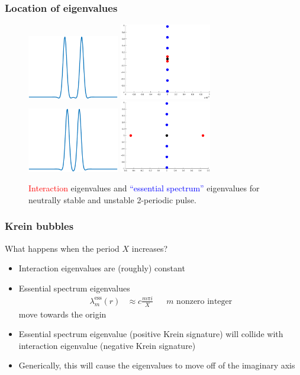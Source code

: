 \documentclass[16pt]{beamer}
\begin{document}
\begin{frame}
	\frametitle{Location of eigenvalues}
	\fontsize{16}{7.2}\selectfont
		\begin{figure}
		\begin{center}
		\includegraphics[width=4cm]{images/2pulsestable}
		\includegraphics[width=4cm]{images/2pulsestableeig}
		\includegraphics[width=4cm]{images/2pulseunstable}
		\includegraphics[width=4cm]{images/2pulseunstableeig}
		\end{center}
		\caption{\textcolor{red}{Interaction} eigenvalues and \textcolor{blue}{``essential spectrum''} eigenvalues for neutrally stable and unstable 2-periodic pulse.}
		\end{figure}
\end{frame}

\begin{frame}
	\frametitle{Krein bubbles}
	\fontsize{16}{7.2}\selectfont
	What happens when the period $X$ increases?
	\begin{itemize}
		\item Interaction eigenvalues are (roughly) constant
		\vspace{0.5cm}
		\item Essential spectrum eigenvalues
		\begin{align*}
    	\lambda_m^{\text{ess}}(r) &\approx c \frac{m \pi i}{X} && m \text{ nonzero integer}
    	\end{align*}
    	move towards the origin
		\vspace{0.5cm}
		\item Essential spectrum eigenvalue (positive Krein signature) will collide with interaction eigenvalue (negative Krein signature)
		\item Generically, this will cause the eigenvalues to move off of the imaginary axis
	\end{itemize}
\end{frame}
\end{document}
